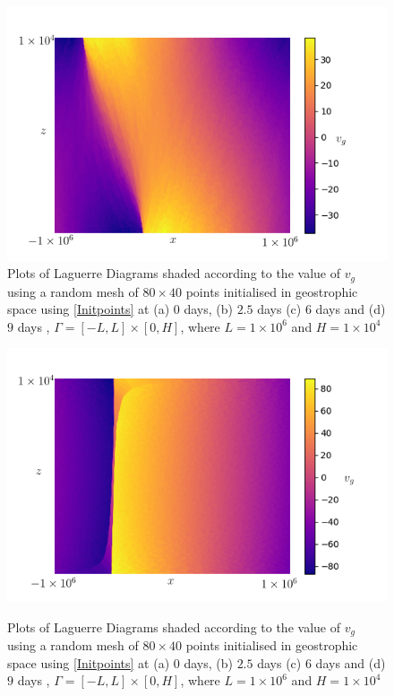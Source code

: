 \begin{figure}
	\centering
	\includegraphics[width=0.8\linewidth]{evaluation/laguerre_diagram_vg_12}
	\caption{Plots of Laguerre Diagrams shaded according to the value of $v_g$ using a random mesh of $80 \times 40$ points initialised in geostrophic space using \ref{Initpoints} at (a) $0$ days, (b) $2.5$ days (c) $6$ days and (d) $9$ days , $\Gamma = [-L,L]\times[0,H]$, where $L = 1\times10^6$ and $H = 1\times10^4$}
\end{figure}
\begin{figure}
	\centering
	\includegraphics[width=0.8\linewidth]{evaluation/laguerre_diagram_vg_18}\\
	\caption{Plots of Laguerre Diagrams shaded according to the value of $v_g$ using a random mesh of $80 \times 40$ points initialised in geostrophic space using \ref{Initpoints} at (a) $0$ days, (b) $2.5$ days (c) $6$ days and (d) $9$ days , $\Gamma = [-L,L]\times[0,H]$, where $L = 1\times10^6$ and $H = 1\times10^4$}
	\label{fig: vg ldiag}
\end{figure}
